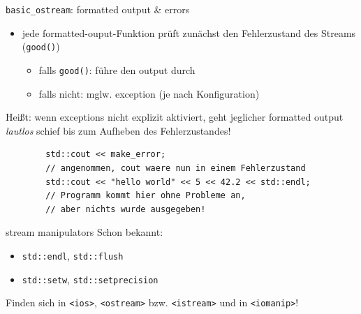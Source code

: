 \begin{frame}[fragile]{\texttt{basic\_ostream}: formatted output \& errors}
	\begin{itemize}
		\item jede formatted-ouput-Funktion prüft zunächst den Fehlerzustand des Streams (\texttt{good()})
		\begin{itemize}
			\item falls \texttt{good()}: führe den output durch
			\item falls nicht: mglw. exception (je nach Konfiguration)
		\end{itemize}
	\end{itemize}
	
	\pause
	\vspace{2em}
	
	Heißt: wenn exceptions nicht explizit aktiviert, geht jeglicher formatted output \emph{lautlos} schief bis zum Aufheben des Fehlerzustandes!
	
	\begin{lstlisting}
		std::cout << make_error;
		// angenommen, cout waere nun in einem Fehlerzustand
		std::cout << "hello world" << 5 << 42.2 << std::endl;
		// Programm kommt hier ohne Probleme an,
		// aber nichts wurde ausgegeben!
	\end{lstlisting}
\end{frame}

\begin{frame}{stream manipulators}
	Schon bekannt:
	\begin{itemize}
		\item \texttt{std::endl}, \texttt{std::flush}
		\item \texttt{std::setw}, \texttt{std::setprecision}
	\end{itemize}
	
	\pause
	\vspace{2em}
	
	Finden sich in \texttt{<ios>}, \texttt{<ostream>} bzw. \texttt{<istream>} und in \texttt{<iomanip>}!
\end{frame}

